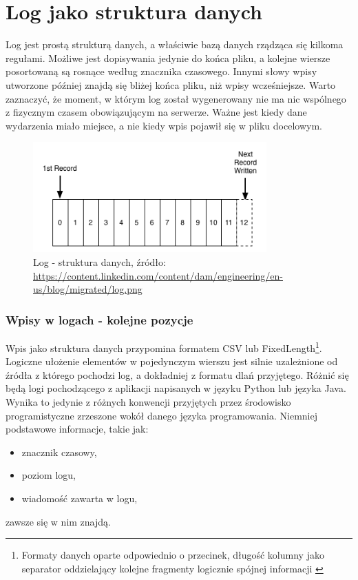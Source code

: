 \section{Log jako struktura danych}
    Log jest prostą strukturą danych, a właściwie bazą danych rządząca się kilkoma regułami.
    Możliwe jest dopisywania jedynie do końca pliku, a kolejne wiersze posortowaną są rosnące
    według znacznika czasowego. Innymi słowy wpisy utworzone później znajdą się bliżej końca pliku,
    niż wpisy wcześniejsze. Warto zaznaczyć, że moment, w którym log został wygenerowany nie ma
    nic wspólnego z fizycznym czasem obowiązującym na serwerze. Ważne jest kiedy dane wydarzenia
    miało miejsce, a nie kiedy wpis pojawił się w pliku docelowym.
    
     \begin{figure}[H]
         \centering
         \includegraphics[width=0.80\textwidth]{images/log_file_structure}
         \caption[Log jako struktura danych]{
             Log - struktura danych, źródło: \url{https://content.linkedin.com/content/dam/engineering/en-us/blog/migrated/log.png}
            }
            \label{chapter:logs:history:log_file_as_data_structure_picture}
    \end{figure}

    \subsubsection{Wpisy w logach - kolejne pozycje}
    \label{chapter:logs:history:log_as_data_structure}
    Wpis jako struktura danych przypomina formatem CSV lub FixedLength\footnote{Formaty danych oparte odpowiednio o przecinek, długość kolumny 
        jako separator oddzielający kolejne fragmenty logicznie spójnej informacji \cite{csv_definition}}. 
    Logiczne ułożenie elementów w pojedynczym wierszu jest silnie uzależnione od źródła z którego pochodzi log, 
    a dokładniej z formatu dlań przyjętego. Różnić się będą logi pochodzącego z aplikacji napisanych w języku Python
    lub języka Java. Wynika to jedynie z różnych konwencji przyjętych przez środowisko 
    programistyczne zrzeszone wokół danego języka programowania. Niemniej podstawowe informacje, takie jak:
    \begin{itemize}
        \item znacznik czasowy,
        \item poziom logu,
        \item wiadomość zawarta w logu,
    \end{itemize}
    zawsze się w nim znajdą. 
    
